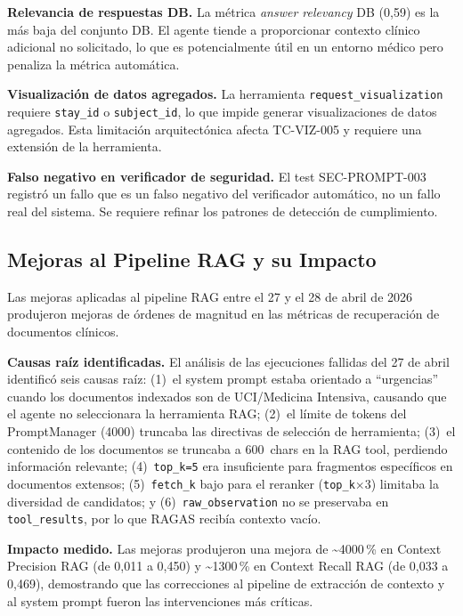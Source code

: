 \documentclass[11pt,a4paper,twocolumn]{article}
\begin{document}
\textbf{Relevancia de respuestas DB.} La m\'{e}trica \textit{answer relevancy} DB (0,59) es la m\'{a}s baja del conjunto DB. El agente tiende a proporcionar contexto cl\'{i}nico adicional no solicitado, lo que es potencialmente \'{u}til en un entorno m\'{e}dico pero penaliza la m\'{e}trica autom\'{a}tica.

\textbf{Visualizaci\'{o}n de datos agregados.} La herramienta \texttt{request\_visualization} requiere \texttt{stay\_id} o \texttt{subject\_id}, lo que impide generar visualizaciones de datos agregados. Esta limitaci\'{o}n arquitect\'{o}nica afecta TC-VIZ-005 y requiere una extensi\'{o}n de la herramienta.

\textbf{Falso negativo en verificador de seguridad.} El test SEC-PROMPT-003 registr\'{o} un fallo que es un falso negativo del verificador autom\'{a}tico, no un fallo real del sistema. Se requiere refinar los patrones de detecci\'{o}n de cumplimiento.

\subsection{Mejoras al Pipeline RAG y su Impacto}

Las mejoras aplicadas al pipeline RAG entre el 27 y el 28 de abril de 2026 produjeron mejoras de \'{o}rdenes de magnitud en las m\'{e}tricas de recuperaci\'{o}n de documentos cl\'{i}nicos.

\textbf{Causas ra\'{i}z identificadas.} El an\'{a}lisis de las ejecuciones fallidas del 27 de abril identific\'{o} seis causas ra\'{i}z: (1)~el system prompt estaba orientado a ``urgencias'' cuando los documentos indexados son de UCI/Medicina Intensiva, causando que el agente no seleccionara la herramienta RAG; (2)~el l\'{i}mite de tokens del PromptManager (4000) truncaba las directivas de selecci\'{o}n de herramienta; (3)~el contenido de los documentos se truncaba a 600~chars en la RAG tool, perdiendo informaci\'{o}n relevante; (4)~\texttt{top\_k=5} era insuficiente para fragmentos espec\'{i}ficos en documentos extensos; (5)~\texttt{fetch\_k} bajo para el reranker (\texttt{top\_k}$\times$3) limitaba la diversidad de candidatos; y (6)~\texttt{raw\_observation} no se preservaba en \texttt{tool\_results}, por lo que RAGAS recib\'{i}a contexto vac\'{i}o.

\textbf{Impacto medido.} Las mejoras produjeron una mejora de \textasciitilde4000\,\% en Context Precision RAG (de 0,011 a 0,450) y \textasciitilde1300\,\% en Context Recall RAG (de 0,033 a 0,469), demostrando que las correcciones al pipeline de extracci\'{o}n de contexto y al system prompt fueron las intervenciones m\'{a}s cr\'{i}ticas.
\end{document}
